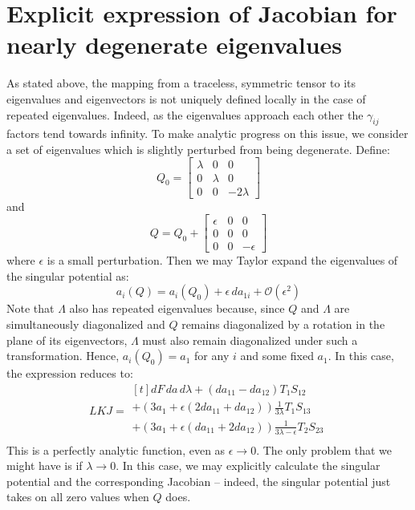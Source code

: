 \documentclass[reqno]{article}
\begin{document}
\section{Explicit expression of Jacobian for nearly degenerate eigenvalues}
As stated above, the mapping from a traceless, symmetric tensor to its eigenvalues and eigenvectors is not uniquely defined locally in the case of repeated eigenvalues. 
Indeed, as the eigenvalues approach each other the $\gamma_{ij}$ factors tend towards infinity.
To make analytic progress on this issue, we consider a set of eigenvalues which is slightly perturbed from being degenerate.
Define:
\begin{equation}
    Q_0
    =
    \begin{bmatrix}
        \lambda &0 &0 \\
        0 &\lambda &0 \\
        0 &0 &-2 \lambda
    \end{bmatrix}
\end{equation}
and
\begin{equation}
    Q
    =
    Q_0
    +
    \begin{bmatrix}
        \epsilon &0 &0 \\
        0 &0 &0 \\
        0 &0 &-\epsilon
    \end{bmatrix}
\end{equation}
where $\epsilon$ is a small perturbation.
Then we may Taylor expand the eigenvalues of the singular potential as:
\begin{equation}
    a_i(Q)
    =
    a_i (Q_0)
    + \epsilon \, da_{1i} 
    + \mathcal{O}(\epsilon^2)
\end{equation}
Note that $\Lambda$ also has repeated eigenvalues because, since $Q$ and $\Lambda$ are simultaneously diagonalized and $Q$ remains diagonalized by a rotation in the plane of its eigenvectors, $\Lambda$ must also remain diagonalized under such a transformation.
Hence, $a_i(Q_0) = a_1$ for any $i$ and some fixed $a_1$.
In this case, the expression reduces to:
\begin{equation}
    LKJ
    =
    \begin{multlined}[t]
    dF \, da \, d\lambda
    + \left(da_{11} - da_{12}\right) T_1 S_{12} \\
    + \left(3 a_1 + \epsilon \left(2 da_{11} + da_{12}\right) \right) \frac{1}{3\lambda} T_1 S_{13} \\
    + \left(3 a_1 + \epsilon \left(da_{11} + 2 da_{12}\right)\right) \frac{1}{3\lambda - \epsilon} T_2 S_{23} \\
    \end{multlined}
\end{equation}
This is a perfectly analytic function, even as $\epsilon \to 0$.
The only problem that we might have is if $\lambda \to 0$.
In this case, we may explicitly calculate the singular potential and the corresponding Jacobian -- indeed, the singular potential just takes on all zero values when $Q$ does.
\end{document}
